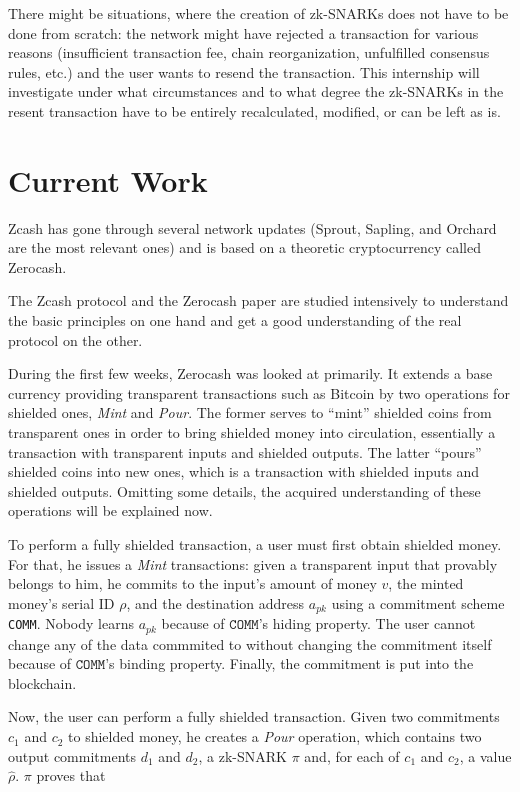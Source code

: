 \documentclass{article}
\begin{document}
There might be situations, where the creation of zk-SNARKs does not have to be done from scratch: the network might have rejected a transaction for various reasons (insufficient transaction fee, chain reorganization, unfulfilled consensus rules, etc.) and the user wants to resend the transaction.
This internship will investigate under what circumstances and to what degree the zk-SNARKs in the resent transaction have to be entirely recalculated, modified, or can be left as is.

\section{Current Work}

Zcash has gone through several network updates (Sprout, Sapling, and Orchard are the most relevant ones) and is based on a theoretic cryptocurrency called Zerocash.

The Zcash protocol \cite{hopwood:zcash} and the Zerocash paper \cite{bensasson:zerocash} are studied intensively to understand the basic principles on one hand and get a good understanding of the real protocol on the other.

During the first few weeks, Zerocash was looked at primarily.
It extends a base currency providing transparent transactions such as Bitcoin by two operations for shielded ones, \textit{Mint} and \textit{Pour}.
The former serves to ``mint'' shielded coins from transparent ones in order to bring shielded money into circulation, essentially a transaction with transparent inputs and shielded outputs.
The latter ``pours'' shielded coins into new ones, which is a transaction with shielded inputs and shielded outputs.
Omitting some details, the acquired understanding of these operations will be explained now.

To perform a fully shielded transaction, a user must first obtain shielded money.
For that, he issues a \textit{Mint} transactions: given a transparent input that provably belongs to him, he commits to the input's amount of money $v$, the minted money's serial ID $\rho$, and the destination address $a_{pk}$ using a commitment scheme \texttt{COMM}.
Nobody learns $a_{pk}$ because of $\texttt{COMM}$'s hiding property.
The user cannot change any of the data commmited to without changing the commitment itself because of $\texttt{COMM}$'s binding property.
Finally, the commitment is put into the blockchain.

Now, the user can perform a fully shielded transaction.
Given two commitments $c_1$ and $c_2$ to shielded money, he creates a \textit{Pour} operation, which contains two output commitments $d_1$ and $d_2$, a zk-SNARK $\pi$ and, for each of $c_1$ and $c_2$, a value $\hat\rho$.
$\pi$ proves that
\end{document}

